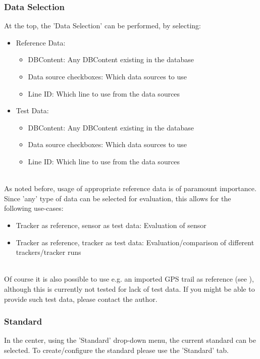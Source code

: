 \subsubsection{Data Selection}

At the top, the 'Data Selection' can be performed, by selecting:
\begin{itemize}  
\item Reference Data:
\begin{itemize}  
\item DBContent: Any DBContent existing in the database
\item Data source checkboxes: Which data sources to use
\item Line ID: Which line to use from the data sources
\end{itemize}
\item Test Data:
\begin{itemize}  
\item DBContent: Any DBContent existing in the database
\item Data source checkboxes: Which data sources to use
\item Line ID: Which line to use from the data sources
\end{itemize}
\end{itemize}
\ \\

As noted before, usage of appropriate reference data is of paramount importance. \\

Since 'any' type of data can be selected for evaluation, this allows for the following use-cases:
\begin{itemize}  
\item Tracker as reference, sensor as test data: Evaluation of sensor
\item Tracker as reference, tracker as test data: Evaluation/comparison of different trackers/tracker runs
\end{itemize}
\ \\

Of course it is also possible to use e.g. an imported GPS trail as reference (see ), although this is currently not tested for lack of test data. 
If you might be able to provide such test data, please contact the author. \\

\subsubsection{Standard}
In the center, using the 'Standard' drop-down menu, the current standard can be selected. To create/configure the standard please use the 'Standard' tab.

